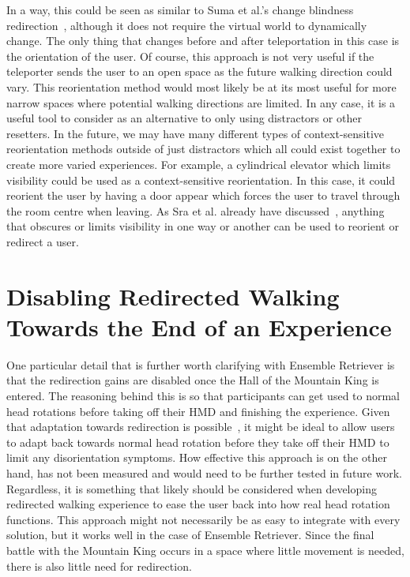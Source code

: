In a way, this could be seen as similar to Suma et al.'s change blindness redirection~\cite{suma2011leveraging}, although it does not require the virtual world to dynamically change. The only thing that changes before and after teleportation in this case is the orientation of the user. Of course, this approach is not very useful if the teleporter sends the user to an open space as the future walking direction could vary. This reorientation method would most likely be at its most useful for more narrow spaces where potential walking directions are limited. In any case, it is a useful tool to consider as an alternative to only using distractors or other resetters. In the future, we may have many different types of context-sensitive reorientation methods outside of just distractors which all could exist together to create more varied experiences. For example, a cylindrical elevator which limits visibility could be used as a context-sensitive reorientation. In this case, it could reorient the user by having a door appear which forces the user to travel through the room centre when leaving. As Sra et al. already have discussed~\cite{sra2018vmotion}, anything that obscures or limits visibility in one way or another can be used to reorient or redirect a user. 


\section{Disabling Redirected Walking Towards the End of an Experience}
One particular detail that is further worth clarifying with Ensemble Retriever is that the redirection gains are disabled once the Hall of the Mountain King is entered. The reasoning behind this is so that participants can get used to normal head rotations before taking off their HMD and finishing the experience. Given that adaptation towards redirection is possible~\cite{bolling2019shrinking, grechkin2016revisiting}, it might be ideal to allow users to adapt back towards normal head rotation before they take off their HMD to limit any disorientation symptoms. How effective this approach is on the other hand, has not been measured and would need to be further tested in future work. Regardless, it is something that likely should be considered when developing redirected walking experience to ease the user back into how real head rotation functions. This approach might not necessarily be as easy to integrate with every solution, but it works well in the case of Ensemble Retriever. Since the final battle with the Mountain King occurs in a space where little movement is needed, there is also little need for redirection.

